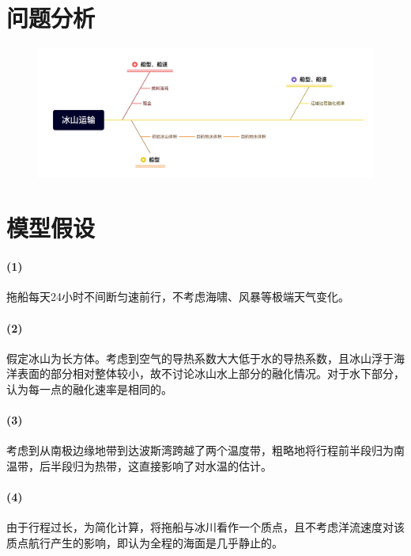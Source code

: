 \documentclass[a4paper,12pt,onecolumn,twoside]{article}
\begin{document}
\section{问题分析}
\begin{figure}[H]
	\includegraphics[scale=0.2]{wentifenxi.jpg}
\end{figure}
\section{模型假设}
\paragraph{(1)}拖船每天24小时不间断匀速前行，不考虑海啸、风暴等极端天气变化。
\paragraph{(2)}假定冰山为长方体。考虑到空气的导热系数大大低于水的导热系数，且冰山浮于海洋表面的部分相对整体较小，故不讨论冰山水上部分的融化情况。对于水下部分，认为每一点的融化速率是相同的。
\paragraph{(3)}考虑到从南极边缘地带到达波斯湾跨越了两个温度带，粗略地将行程前半段归为南温带，后半段归为热带，这直接影响了对水温的估计。
\paragraph{(4)}由于行程过长，为简化计算，将拖船与冰川看作一个质点，且不考虑洋流速度对该质点航行产生的影响，即认为全程的海面是几乎静止的。
\end{document}
